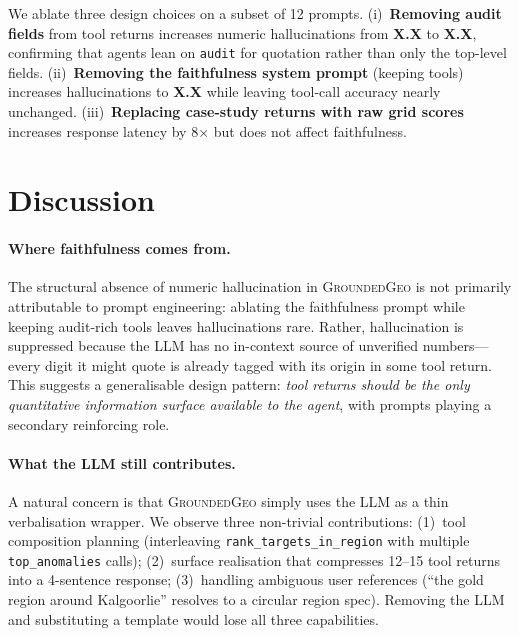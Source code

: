 \documentclass[11pt]{article}
\begin{document}
We ablate three design choices on a subset of 12 prompts.
(i)~\textbf{Removing audit fields} from tool returns increases
numeric hallucinations from \textbf{X.X} to \textbf{X.X}, confirming
that agents lean on \texttt{audit} for quotation rather than only the
top-level fields.
(ii)~\textbf{Removing the faithfulness system prompt} (keeping
tools) increases hallucinations to \textbf{X.X} while leaving
tool-call accuracy nearly unchanged.
(iii)~\textbf{Replacing case-study returns with raw grid scores}
increases response latency by 8$\times$ but does not affect
faithfulness.

\section{Discussion}
\label{sec:discussion}


\paragraph{Where faithfulness comes from.}
The structural absence of numeric hallucination in \textsc{GroundedGeo}
is not primarily attributable to prompt engineering: ablating the
faithfulness prompt while keeping audit-rich tools leaves
hallucinations rare. Rather, hallucination is suppressed because the
LLM has no in-context source of unverified numbers---every digit it
might quote is already tagged with its origin in some tool return.
This suggests a generalisable design pattern: \emph{tool returns
should be the only quantitative information surface available to the
agent}, with prompts playing a secondary reinforcing role.

\paragraph{What the LLM still contributes.}
A natural concern is that \textsc{GroundedGeo} simply uses the LLM as
a thin verbalisation wrapper. We observe three non-trivial
contributions: (1)~tool composition planning (interleaving
\texttt{rank\_targets\_in\_region} with multiple \texttt{top\_anomalies}
calls); (2)~surface realisation that compresses 12--15 tool returns
into a 4-sentence response; (3)~handling ambiguous user references
(``the gold region around Kalgoorlie'' resolves to a circular region
spec). Removing the LLM and substituting a template would lose all
three capabilities.
\end{document}
